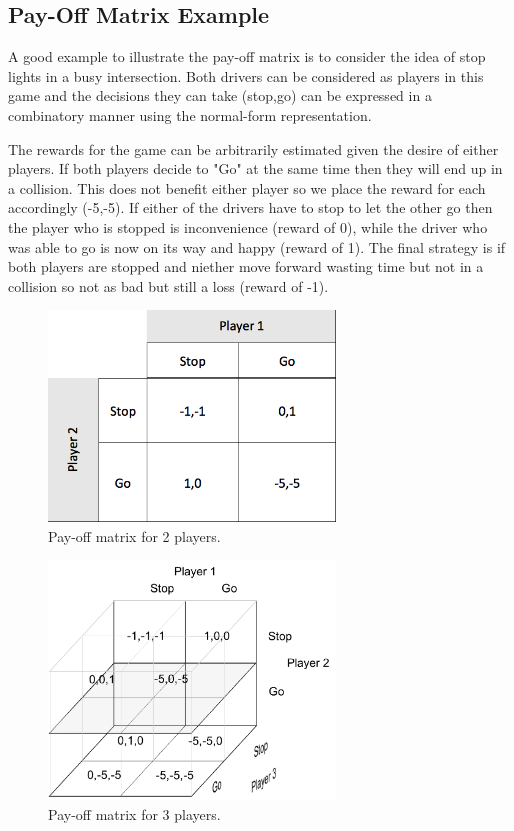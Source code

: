 \subsection{Pay-Off Matrix Example}

A good example to illustrate the pay-off matrix is to consider
the idea of stop lights in a busy intersection. Both drivers can be 
considered as players in this game and the decisions they can take 
(stop,go) can be expressed in a combinatory manner using the normal-form 
representation. 

The rewards for the game can be arbitrarily 
estimated given the desire of either players. If both players 
decide to "Go" at the same time then they will end up in a 
collision. This does not benefit either player so we place the 
reward for each accordingly (-5,-5). If either of the drivers 
have to stop to let the other go then the player who is stopped 
is inconvenience (reward of 0), while the driver who was able 
to go is now on its way and happy (reward of 1). The final strategy 
is if both players are stopped and niether move forward wasting 
time but not in a collision so not as bad but still a loss 
(reward of -1).

\begin{figure}[th]
  \centering
  \includegraphics[width=3.0in]{Figures/pay-off-matrix.png}
  \decoRule
  \caption[2 player-payoff]{Pay-off matrix for 2 players.}
  \label{fig:Pay-offMatrixfor2Players}
\end{figure}


\begin{figure}[th]
  \centering
  \includegraphics[width=3.0in]{Figures/3way_intersection}
  \decoRule
  \caption[3 player-payoff]{Pay-off matrix for 3 players.}
  \label{fig:Pay-offMatrixfor3Players}
\end{figure}


